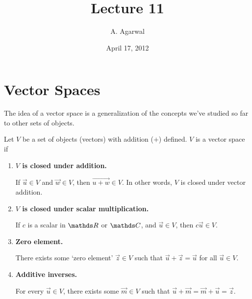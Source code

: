 \documentclass[11pt]{article}
\title{Lecture 11}
\author{A. Agarwal}
\date{April 17, 2012}
\newcommand{\vek}[1]{\vec{#1}}
\begin{document}

\section*{Vector Spaces}

The idea of a vector space is a generalization of the concepts we've studied so far to other sets of objects.


\begin{minipage}{.95\textwidth}

Let $V$ be a set of objects (vectors) with addition ($+$) defined. $V$ is a vector space if
\begin{enumerate}
\item{
\textbf{$V$ is closed under addition.}

If $\vek{u} \in V$ and $\vek{w} \in V$, then $\vek{u+w} \in V$. In other words, $V$ is closed under vector addition.
}
\item{
\textbf{$V$ is closed under scalar multiplication.}

If $c$ is a scalar in $\bbR$ or $\bbC$, and $\vek{u} \in V$, then $c \vek{u} \in V$.
}
\item{
\textbf{Zero element.}

There exists some `zero element' $\vek{z} \in V$ such that $\vek{u} + \vek{z} = \vek{u}$ for all $\vek{u} \in V$.
}
\item{
\textbf{Additive inverses.}

For every $\vek{u} \in V$, there exists some $\vek{m} \in V$ such that $\vek{u} + \vek{m} = \vek{m} + \vek{u} = \vek{z}$.
}
\end{enumerate}
\end{minipage}
\end{document}
